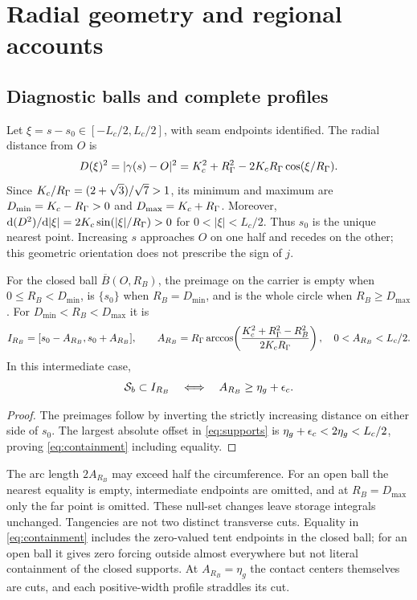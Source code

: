 \section{Radial geometry and regional accounts}\label{sec:account}
\subsection{Diagnostic balls and complete profiles}\label{sec:radial}
Let $\xi=s-s_0\in[-L_c/2,L_c/2]$, with seam endpoints identified. The radial distance from $O$ is
\begin{equation}\label{eq:radial}
 D(\xi)^2=|\gamma(s)-O|^2
 =K_c^2+R_\Gamma^2-2K_cR_\Gamma\cos(\xi/R_\Gamma).
\end{equation}
Since $K_c/R_\Gamma=(2+\sqrt3)/\sqrt7>1$, its minimum and maximum are $D_{\min}=K_c-R_\Gamma>0$ and $D_{\max}=K_c+R_\Gamma$. Moreover,
$\mathrm d(D^2)/\mathrm d|\xi|=2K_c\sin(|\xi|/R_\Gamma)>0$ for $0<|\xi|<L_c/2$. Thus $s_0$ is the unique nearest point. Increasing $s$ approaches $O$ on one half and recedes on the other; this geometric orientation does not prescribe the sign of $j$.

\begin{proposition}\label{prop:ball}
For the closed ball $\overline B(O,R_B)$, the preimage on the carrier is empty when $0\le R_B<D_{\min}$, is $\{s_0\}$ when $R_B=D_{\min}$, and is the whole circle when $R_B\ge D_{\max}$. For $D_{\min}<R_B<D_{\max}$ it is
\begin{equation}\label{eq:halfarc}
 I_{R_B}=[s_0-A_{R_B},s_0+A_{R_B}],\qquad
 A_{R_B}=R_\Gamma\arccos\!\left(\frac{K_c^2+R_\Gamma^2-R_B^2}{2K_cR_\Gamma}\right),
 \quad 0<A_{R_B}<L_c/2.
\end{equation}
In this intermediate case,
\begin{equation}\label{eq:containment}
 \mathcal S_b\subset I_{R_B}\quad\Longleftrightarrow\quad A_{R_B}\ge\eta_g+\epsilon_c.
\end{equation}
\end{proposition}
\begin{proof}
The preimages follow by inverting the strictly increasing distance on either side of $s_0$. The largest absolute offset in \eqref{eq:supports} is $\eta_g+\epsilon_c<2\eta_g<L_c/2$, proving \eqref{eq:containment} including equality.
\end{proof}

The arc length $2A_{R_B}$ may exceed half the circumference. For an open ball the nearest equality is empty, intermediate endpoints are omitted, and at $R_B=D_{\max}$ only the far point is omitted. These null-set changes leave storage integrals unchanged. Tangencies are not two distinct transverse cuts. Equality in \eqref{eq:containment} includes the zero-valued tent endpoints in the closed ball; for an open ball it gives zero forcing outside almost everywhere but not literal containment of the closed supports. At $A_{R_B}=\eta_g$ the contact centers themselves are cuts, and each positive-width profile straddles its cut.

